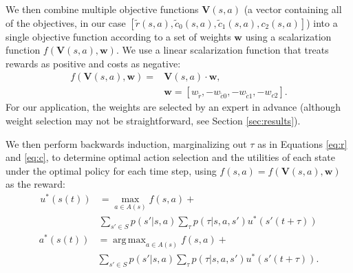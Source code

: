 \documentclass[letterpaper, 10 pt, conference]{ieeeconf}  %
\DeclareMathOperator*{\argmax}{arg\,max}
\begin{document}
We then combine multiple objective functions $\mathbf{V}(s,a)$ (a vector containing all of the objectives, in our case $[\tilde{r}(s,a), \tilde{c}_0(s,a), \tilde{c}_1(s,a), c_2(s,a)]$) into a single objective function according to a set of weights $\mathbf{w}$ using a scalarization function $f(\mathbf{V}(s,a), \mathbf{w})$.  We use a linear scalarization function that treats rewards as positive and costs as negative:
\begin{equation}
\begin{split}
f(\mathbf{V}(s,a), \mathbf{w})= & \mathbf{V}(s,a) \cdot \mathbf{w},\\
& \mathbf{w}=[w_{\tilde{r}}, -w_{\tilde{c}0}, -w_{\tilde{c}1}, -w_{c2}].
\end{split}
\end{equation}
For our application, the weights are selected by an expert in advance (although weight selection may not be straightforward, see Section \ref{sec:results}).

We then perform backwards induction, marginalizing out $\tau$ as in Equations \ref{eq:r} and \ref{eq:c}, to determine optimal action selection and the utilities of each state under the optimal policy for each time step, using $f(s,a) = f(\mathbf{V}(s,a), \mathbf{w})$ as the reward:
\begin{equation}
\begin{split}
u^*(s(t))&={}\max_{a\in A(s)}f(s,a) +{} \\
&\sum_{s'\in S}{p(s'|s,a)\sum_{\tau}{p(\tau|s,a,s')u^*(s'(t+\tau))}}
\end{split}
\label{eq:bi1}
\end{equation}
\begin{equation}
\begin{split}
a^*(s(t))&={}\argmax_{a\in A(s)}f(s,a) +{} \\
&\sum_{s'\in S}{p(s'|s,a)\sum_{\tau}{p(\tau|s,a,s')u^*(s'(t+\tau))}}.
\end{split}
\label{eq:bi2}
\end{equation}
\end{document}
